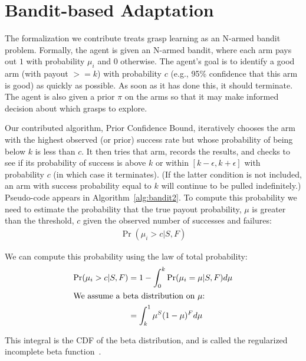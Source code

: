 \documentclass{article}
\newcommand{\algorithmDTxt}{Prior Confidence Bound\xspace}
\begin{document}
\section{Bandit-based Adaptation}

The formalization we contribute treats grasp learning as an N-armed
bandit problem.  Formally, the agent is given an N-armed bandit, where
each arm pays out $1$ with probability $\mu_i$ and $0$ otherwise.  The
agent's goal is to identify a good arm (with payout $>= k$) with
probability $c$ (e.g., 95\% confidence that this arm is good) as
quickly as possible.  As soon as it has done this, it should
terminate.  The agent is also given a prior $\pi$ on the arms so that
it may make informed decision about which grasps to explore.

Our contributed algorithm, \algorithmDTxt, iteratively chooses the arm
with the highest observed (or prior) success rate but whose
probability of being below $k$ is less than $c$. It then tries that
arm, records the results, and checks to see if its probability of
success is above $k$ or within $[k-\epsilon, k+\epsilon]$ with
probability $c$ (in which case it terminates). (If the latter
condition is not included, an arm with success probability equal to
$k$ will continue to be pulled indefinitely.)  Pseudo-code appears in
Algorithm~\ref{alg:bandit2}.  To compute this probability we need to
estimate the probability that the true payout probability, $\mu$ is
greater than the threshold, $c$ given the observed number of successes
and failures:
\begin{align}
\Pr(\mu_i > c|  S, F)
\end{align}

We can compute this probability using the law of total probability:
\begin{align}
\Pr(\mu_i > c|  S, F) &= 1 - \int_0^k \Pr(\mu_i=\mu | S, F) d\mu\\
\intertext{We assume a beta distribution on $\mu$:}
                      &= \int_k^1 \mu^S (1- \mu) ^F d\mu
\end{align}

This integral is the CDF of the beta distribution, and is called the
regularized incomplete beta function~\citep{olver10}. 
\end{document}
